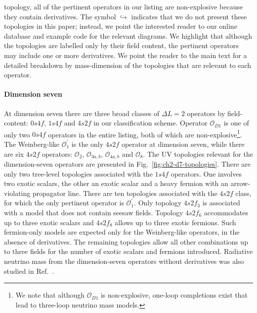 \begin{table}[t]
{    topology, all of the pertinent operators in our listing are non-explosive
    because they contain derivatives. The symbol $\hookrightarrow$ indicates
    that we do not present these topologies in this paper; instead, we point the
    interested reader to our online database and example code for the relevant
    diagrams. We highlight that although the topologies are labelled only by
    their field content, the pertinent operators may include one or more
    derivatives. We point the reader to the main text for a detailed breakdown
    by mass-dimension of the topologies that are relevant to each operator.}
  \label{tab:ch2-topology-data}
\end{table}

\paragraph{Dimension seven} At dimension seven there are three broad classes of
$\Delta L = 2$ operators by field-content: $0s4f$, $1s4f$ and $4s2f$ in our
classification scheme. Operator $\mathcal{O}_{D1}$ is one of only two $0s4f$
operators in the entire listing, both of which are non-explosive\footnote{We
  note that although $\mathcal{O}_{D1}$ is non-explosive, one-loop completions
  exist that lead to three-loop neutrino mass models.}. The Weinberg-like
$\mathcal{O}_{1}^{\prime}$ is the only $4s2f$ operator at dimension seven, while
there are six $4s2f$ operators: $\mathcal{O}_{2}$, $\mathcal{O}_{3a,b}$,
$\mathcal{O}_{4a,b}$ and $\mathcal{O}_{8}$. The UV topologies relevant for the
dimension-seven operators are presented in Fig.~\ref{fig:ch2-d7-topologies}. There
are only two tree-level topologies associated with the $1s4f$ operators. One
involves two exotic scalars, the other an exotic scalar and a heavy fermion with
an arrow-violating propagator line. There are ten topologies associated with the
$4s2f$ class, for which the only pertinent operator is
$\mathcal{O}_{1}^{\prime}$. Only topology $4s2f_{3}$ is associated with a model
that does not contain seesaw fields. Topology $4s2f_{6}$ accommodates up to
three exotic scalars and $4s2f_{8}$ allows up to three exotic fermions. Such
fermion-only models are expected only for the Weinberg-like operators, in the
absence of derivatives. The remaining topologies allow all other combinations up
to three fields for the number of exotic scalars and fermions introduced.
Radiative neutrino mass from the dimension-seven operators without derivatives
was also studied in Ref.~\cite{Cai:2014kra}.

